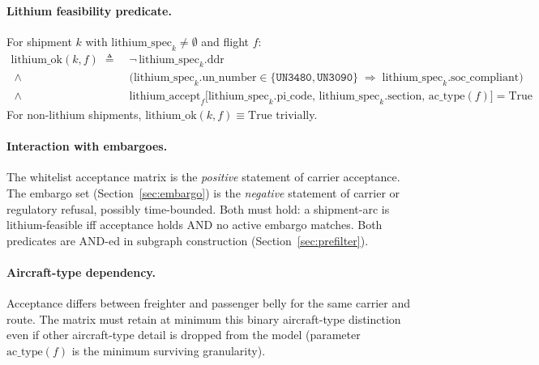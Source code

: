 \documentclass[11pt,a4paper]{article}
\newcommand{\defeq}{\triangleq}
\theoremstyle{definition}
\begin{document}
\paragraph{Lithium feasibility predicate.}
For shipment \(k\) with \(\text{lithium\_spec}_k \neq \emptyset\) and flight \(f\):
\begin{equation}
  \begin{aligned}
    \text{lithium\_ok}(k, f) \;\defeq\;
    & \neg \, \text{lithium\_spec}_k.\text{ddr} \\
    \;\wedge\; & \bigl( \text{lithium\_spec}_k.\text{un\_number} \in \{\texttt{UN3480}, \texttt{UN3090}\}
                 \;\Rightarrow\; \text{lithium\_spec}_k.\text{soc\_compliant} \bigr) \\
    \;\wedge\; & \text{lithium\_accept}_f\!\bigl[\text{lithium\_spec}_k.\text{pi\_code},\,
                 \text{lithium\_spec}_k.\text{section},\, \text{ac\_type}(f)\bigr] = \text{True}
  \end{aligned}
  \label{eq:lithium-ok}
\end{equation}
For non-lithium shipments, \(\text{lithium\_ok}(k, f) \equiv \text{True}\) trivially.

\paragraph{Interaction with embargoes.}
The whitelist acceptance matrix is the \emph{positive} statement of carrier
acceptance. The embargo set (Section~\ref{sec:embargo}) is the \emph{negative}
statement of carrier or regulatory refusal, possibly time-bounded. Both must hold:
a shipment-arc is lithium-feasible iff acceptance holds AND no active embargo
matches. Both predicates are AND-ed in subgraph construction
(Section~\ref{sec:prefilter}).

\paragraph{Aircraft-type dependency.}
Acceptance differs between freighter and passenger belly for the same carrier and
route. The matrix must retain at minimum this binary aircraft-type distinction
even if other aircraft-type detail is dropped from the model (parameter
\(\text{ac\_type}(f)\) is the minimum surviving granularity).
\end{document}

